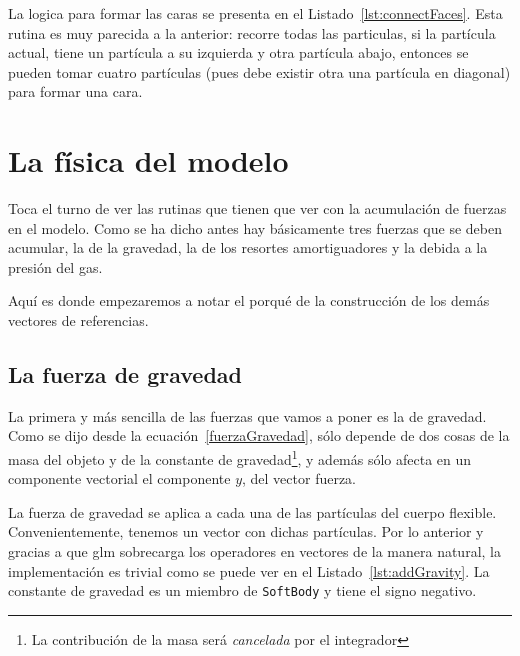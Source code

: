 

La logica para formar las caras se presenta en el Listado~\ref{lst:connectFaces}.
Esta rutina es muy parecida a la anterior: recorre todas las particulas, si la partícula actual, tiene un partícula a su izquierda y otra partícula abajo, entonces se pueden tomar cuatro partículas (pues debe existir otra una partícula en diagonal) para formar una cara.

\section{La física del modelo}
Toca el turno de ver las rutinas que tienen que ver con la acumulación de fuerzas en el modelo.
Como se ha dicho antes hay básicamente tres fuerzas que se deben acumular, la de la gravedad, la de los resortes amortiguadores y la debida a la presión del gas.

Aquí es donde empezaremos a notar el porqué de la construcción de los demás vectores de referencias.

\subsection{La fuerza de gravedad}
La primera y más sencilla de las fuerzas que vamos a poner es la de gravedad.
Como se dijo desde la ecuación~\eqref{fuerzaGravedad}, sólo depende de dos cosas de la masa del objeto y de la constante de gravedad\footnote{La contribución de la masa será \emph{cancelada} por el integrador}, y además sólo afecta en un componente vectorial el componente $y$, del vector fuerza.

La fuerza de gravedad se aplica a cada una de las partículas del cuerpo flexible. 
Convenientemente, tenemos un vector con dichas partículas.
Por lo anterior y gracias a que glm sobrecarga los operadores en vectores de la manera natural, la implementación es trivial como se puede ver en el Listado~\ref{lst:addGravity}.
La constante de gravedad es un miembro de \texttt{SoftBody} y tiene el signo negativo.


